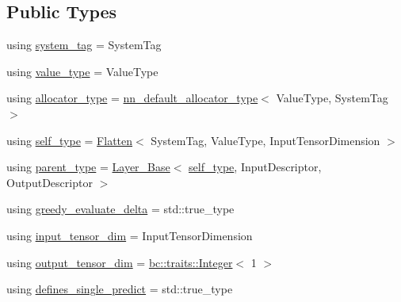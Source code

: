 \subsection*{Public Types}
\begin{DoxyCompactItemize}
\item 
using \hyperlink{structbc_1_1nn_1_1Flatten_a3691e26f7d05a76e7c84f86930e4a5ed}{system\+\_\+tag} = System\+Tag
\item 
using \hyperlink{structbc_1_1nn_1_1Flatten_af6a4f22abc0a8e8f8bb1624abd97b500}{value\+\_\+type} = Value\+Type
\item 
using \hyperlink{structbc_1_1nn_1_1Flatten_aac419d81dc54ef6d11b042a0ad05cc11}{allocator\+\_\+type} = \hyperlink{namespacebc_1_1nn_a0025752fc3f47f988b3fae106c825860}{nn\+\_\+default\+\_\+allocator\+\_\+type}$<$ Value\+Type, System\+Tag $>$
\item 
using \hyperlink{structbc_1_1nn_1_1Flatten_a8bf8c3ab507fae549695110b4c1d4762}{self\+\_\+type} = \hyperlink{structbc_1_1nn_1_1Flatten}{Flatten}$<$ System\+Tag, Value\+Type, Input\+Tensor\+Dimension $>$
\item 
using \hyperlink{structbc_1_1nn_1_1Flatten_adad203394f78c9d3bd9b0962c8ca195e}{parent\+\_\+type} = \hyperlink{structbc_1_1nn_1_1Layer__Base}{Layer\+\_\+\+Base}$<$ \hyperlink{structbc_1_1nn_1_1Flatten_a8bf8c3ab507fae549695110b4c1d4762}{self\+\_\+type}, Input\+Descriptor, Output\+Descriptor $>$
\item 
using \hyperlink{structbc_1_1nn_1_1Flatten_afd38f0f24bbf98d7f5ecb70198a16b16}{greedy\+\_\+evaluate\+\_\+delta} = std\+::true\+\_\+type
\item 
using \hyperlink{structbc_1_1nn_1_1Flatten_a33099a8688031a672bd911871d9ae0d2}{input\+\_\+tensor\+\_\+dim} = Input\+Tensor\+Dimension
\item 
using \hyperlink{structbc_1_1nn_1_1Flatten_a15ddd4e65597ff56624b08d498a47c6d}{output\+\_\+tensor\+\_\+dim} = \hyperlink{structbc_1_1traits_1_1Integer}{bc\+::traits\+::\+Integer}$<$ 1 $>$
\item 
using \hyperlink{structbc_1_1nn_1_1Flatten_a09f418b2c69a0675443ea4f86d94dffc}{defines\+\_\+single\+\_\+predict} = std\+::true\+\_\+type
\end{DoxyCompactItemize}
